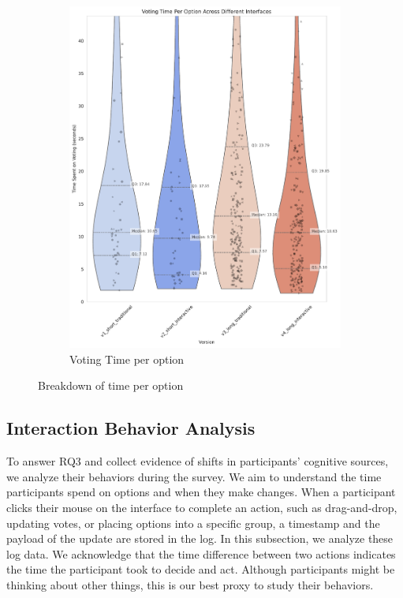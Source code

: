 {\begin{landscape}
\begin{figure}[ht]
\begin{subfigure}[b]{0.26\pdfpageheight}
            \includegraphics[width=\textwidth]{content/image/results/voting_time_per_option.pdf}
            \caption{Voting Time per option}
            \label{fig:vote_time}
        \end{subfigure}
        \caption{Breakdown of time per option}
        \label{fig:Time Spent Per Option Per Person}
    \end{figure}
\end{landscape}
}

\subsection{Interaction Behavior Analysis}
\label{sec:act}
To answer RQ3 and collect evidence of shifts in participants' cognitive sources, we analyze their behaviors during the survey. We aim to understand the time participants spend on options and when they make changes. When a participant clicks their mouse on the interface to complete an action, such as drag-and-drop, updating votes, or placing options into a specific group, a timestamp and the payload of the update are stored in the log. In this subsection, we analyze these log data. We acknowledge that the time difference between two actions indicates the time the participant took to decide and act. Although participants might be thinking about other things, this is our best proxy to study their behaviors.


